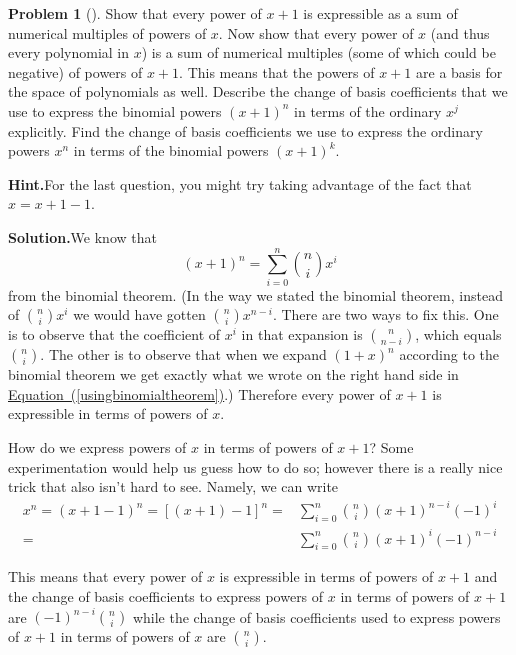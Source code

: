 \documentclass[10pt,]{book}
\theoremstyle{plain}
\theoremstyle{definition}
\newtheorem{activity}[project]{Problem}
\theoremstyle{definition}
\numberwithin{equation}{chapter}
\newcommand{\amp}{&}
\begin{document}
\begin{activity}[]\label{activity-153}
Show that every power of \(x+1\) is expressible as a sum of numerical multiples of powers of \(x\). Now show that every power of \(x\) (and thus every polynomial in \(x\)) is a sum of numerical multiples (some of which could be negative) of powers of \(x+1\). This means that the powers of \(x+1\) are a basis for the space of polynomials as well. Describe the change of basis coefficients that we use to express the binomial powers \((x+1)^n\) in terms of the ordinary \(x^j\) explicitly. Find the change of basis coefficients we use to express the ordinary powers \(x^n\) in terms of the binomial powers \((x+1)^k\).%
\par\medskip\noindent%
\textbf{Hint.}\quad For the last question, you might try taking advantage of the fact that \(x = x + 1 - 1\).%
\par\medskip\noindent%
\textbf{Solution.}\quad We know that%
\begin{equation}
(x+1)^n=\sum_{i=0}^n \binom{n}{i}x^{i}\label{usingbinomialtheorem}
\end{equation}
from the binomial theorem. (In the way we stated the binomial theorem, instead of \(\binom{n}{i}x^i\) we would have gotten \(\binom{n}{i}x^{n-i}\). There are two ways to fix this. One is to observe that the coefficient of \(x^i\) in that expansion is \(\binom{n}{n-i}\), which equals \(\binom{n}{i}\). The other is to observe that when we expand \((1+x)^n\) according to the binomial theorem we get exactly what we wrote on the right hand side in \hyperref[usingbinomialtheorem]{Equation~(\ref{usingbinomialtheorem})}.) Therefore every power of \(x+1\) is expressible in terms of powers of \(x\).%
\par
How do we express powers of \(x\) in terms of powers of \(x+1\)? Some experimentation would help us guess how to do so; however there is a really nice trick that also isn't hard to see. Namely, we can write%
\begin{align*}
x^n =(x+1-1)^n= [(x+1) -1]^n =\amp  \sum_{i=0}^n \binom{n}{i}(x+1)^{n-i}(-1)^i\\
=\amp
\sum_{i=0}^n \binom{n}{i}(x+1)^i(-1)^{n-i}
\end{align*}
%
\par
This means that every power of \(x\) is expressible in terms of powers of \(x+1\) and the change of basis coefficients to express powers of \(x\) in terms of powers of \(x+1\) are \((-1)^{n-i}\binom{n}{i}\) while the change of basis coefficients used to express powers of \(x+1\) in terms of powers of \(x\) are \(\binom{n}{i}\).%
\end{activity}
\end{document}

